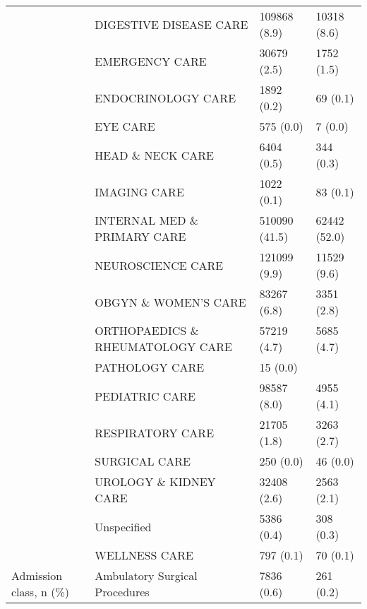 \begin{tabular}{llll}
                                       & DIGESTIVE DISEASE CARE &            109868 (8.9) &       10318 (8.6) \\
                                       & EMERGENCY CARE &             30679 (2.5) &        1752 (1.5) \\
                                       & ENDOCRINOLOGY CARE &              1892 (0.2) &          69 (0.1) \\
                                       & EYE CARE &               575 (0.0) &           7 (0.0) \\
                                       & HEAD \& NECK CARE &              6404 (0.5) &         344 (0.3) \\
                                       & IMAGING CARE &              1022 (0.1) &          83 (0.1) \\
                                       & INTERNAL MED \& PRIMARY CARE &           510090 (41.5) &      62442 (52.0) \\
                                       & NEUROSCIENCE CARE &            121099 (9.9) &       11529 (9.6) \\
                                       & OBGYN \& WOMEN'S CARE &             83267 (6.8) &        3351 (2.8) \\
                                       & ORTHOPAEDICS \& RHEUMATOLOGY CARE &             57219 (4.7) &        5685 (4.7) \\
                                       & PATHOLOGY CARE &                15 (0.0) &                   \\
                                       & PEDIATRIC CARE &             98587 (8.0) &        4955 (4.1) \\
                                       & RESPIRATORY CARE &             21705 (1.8) &        3263 (2.7) \\
                                       & SURGICAL CARE &               250 (0.0) &          46 (0.0) \\
                                       & UROLOGY \& KIDNEY CARE &             32408 (2.6) &        2563 (2.1) \\
                                       & Unspecified &              5386 (0.4) &         308 (0.3) \\
                                       & WELLNESS CARE &               797 (0.1) &          70 (0.1) \\
Admission class, n (\%) & Ambulatory Surgical Procedures &              7836 (0.6) &         261 (0.2) \\

\end{tabular}
